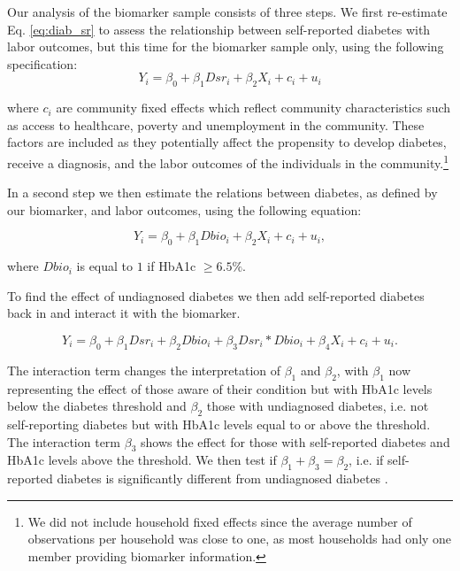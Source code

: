 \documentclass[12pt,english]{article}
\begin{document}
Our analysis of the biomarker sample consists of three steps. We first re-estimate Eq. \ref{eq:diab_sr} to assess the relationship between self-reported diabetes with labor outcomes, but this time for the biomarker sample only, using the following specification:
\begin{equation}
Y_{i}=\beta_{0}+\beta_{1}Dsr_{i}+\beta_{2}X_{i}+c_{i}+u_{i}\label{eq:diab_sr}
\end{equation}

where $c_{i}$ are community fixed effects which reflect community characteristics such as access to healthcare, poverty and unemployment in the community. These factors are included as they potentially affect the propensity to develop diabetes, receive a diagnosis, and the labor outcomes of the individuals in the community.\footnote{We did not include household fixed effects since the average number of observations per household was close to one, as most households had only one member providing biomarker information.}

In a second step we then estimate the relations between diabetes, as defined by our biomarker, and labor outcomes, using the following equation:

\begin{equation}
Y_{i}=\beta_{0}+\beta_{1}Dbio_{i}+\beta_{2}X_{i}+c_{i}+u_{i}\label{eq:diab},
\end{equation}

where $Dbio_{i}$ is equal to $1$ if \ac{HbA1c} $\geq6.5\%$. 

To find the effect of undiagnosed diabetes we then add self-reported diabetes back in and interact it with the biomarker.

\begin{equation}
Y_{i}=\beta_{0}+\beta_{1}Dsr_{i}+\beta_{2}Dbio_{i}+\beta_{3}Dsr_{i}*Dbio_{i}+\beta_{4}X_{i}+c_{i}+u_{i}.\label{eq:diab_ud}
\end{equation}

The interaction term changes the interpretation of $\beta_{1}$ and $\beta_{2}$, with $\beta_{1}$ now representing the effect of those aware of their condition but with \ac{HbA1c} levels below the diabetes threshold and $\beta_{2}$ those with undiagnosed diabetes, i.e. not self-reporting diabetes but with \ac{HbA1c} levels equal to or above the threshold. The interaction term $\beta_{3}$ shows the effect for those with self-reported diabetes and \ac{HbA1c} levels above the threshold. We then test if $\beta_{1} + \beta_{3} = \beta_{2}$, i.e. if self-reported diabetes is significantly different from undiagnosed diabetes . 
\end{document}
